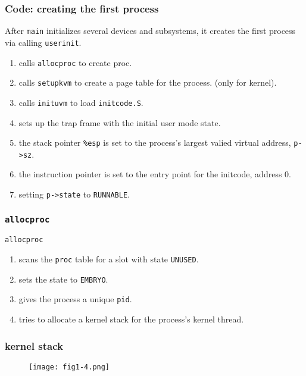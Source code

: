 \documentclass{beamer}
\begin{document}
\begin{frame}[t]
  \frametitle{Code: creating the first process}
  After \texttt{main} initializes several devices and subsystems,
  it creates the first process\\

  via calling \texttt{userinit}.
  \begin{enumerate}
  \item calls \texttt{allocproc} to create proc.
  \item calls \texttt{setupkvm} to create a page table for the process. (only for kernel).
  \item calls \texttt{inituvm} to load \texttt{initcode.S}.
  \item sets up the trap frame with the initial user mode state.
  \item the stack pointer \texttt{\%esp} is set to the process's largest valied virtual
    address, \texttt{p->sz}.
  \item the instruction pointer is set to the entry point for the initcode, address 0.
  \item setting \texttt{p->state} to \texttt{RUNNABLE}.
  \end{enumerate}

\end{frame}


\begin{frame}[t]
  \frametitle{\texttt{allocproc}}

  \texttt{allocproc}
  \begin{enumerate}
  \item scans the \texttt{proc} table for a slot with state \texttt{UNUSED}.
  \item sets the state to \texttt{EMBRYO}.
  \item gives the process a unique \texttt{pid}.
  \item tries to allocate a kernel stack for the process's kernel thread.
  \end{enumerate}
  
\end{frame}


\begin{frame}[t]
  \frametitle{kernel stack}
  \begin{figure}[ht]
    \centering
    \texttt{[image: fig1-4.png]}
  \end{figure}

\end{frame}
\end{document}
